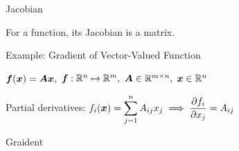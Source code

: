 \documentclass[handout,fleqn,aspectratio=169]{beamer}
\begin{document}
\begin{frame}{Jacobian}


\bci
\item For a \bluef{$\realn \mapsto \realm$} function, its Jacobian is a  matrix. 
\eci

\end{frame}

\begin{frame}{Example: Gradient of Vector-Valued Function}

\bci
\item $\bm{f}(\bm{x}) = \bm{A} \bm{x},$ $\bm{f}: {\mathbb R}^{n} \mapsto {\mathbb R}^{m},$ $\bm{A} \in {\mathbb R}^{m \times n},$ $\bm{x} \in {\mathbb R}^{n}$

\item Partial derivatives: 
$
\displaystyle
f_i(\bm{x}) = \sum_{j=1}^n A_{ij} x_j \implies \frac{\partial f_i}{\partial x_j} = A_{ij}
$

\item Graident

\eci

\end{frame}
\end{document}
